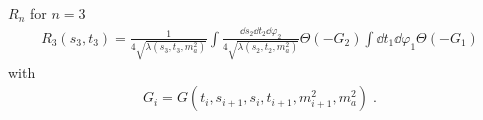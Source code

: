 \begin{bluenv}{$R_n$ for $n = 3$}
    \vspace{-3ex}
    \begin{align}
        \label{eq:recursive-phase-space-with-momentum-transfer-for-n=3}
        R_3(s_3, t_3) 
            = \frac{1}{4\sqrt{\lambda(s_3, t_3, m_a^2)}}
              \int \frac{\dd s_2 \dd t_2 \dd \varphi_2}
                        {4 \sqrt{\lambda(s_2, t_2, m_a^2)}}
              \Theta(- G_2) 
              \int \dd t_1 \dd \varphi_1 \Theta(- G_1)
    \end{align}
    with 
    \begin{gather}
        G_i = G(t_i, s_{i+1}, s_i, t_{i+1}, m_{i+1}^2, m_a^2) \; .
    \end{gather}
\end{bluenv}

